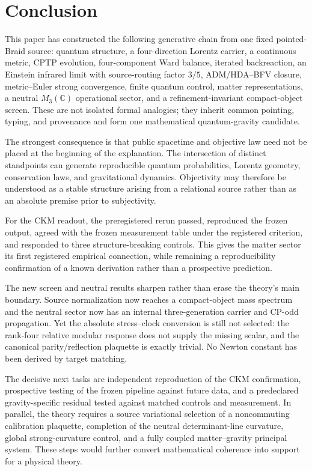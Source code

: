\documentclass[11pt]{article}
\theoremstyle{definition}
\theoremstyle{remark}
\begin{document}
\section{Conclusion}

This paper has constructed the following generative chain from one fixed pointed-Braid source: quantum structure, a four-direction Lorentz carrier, a continuous metric, CPTP evolution, four-component Ward balance, iterated backreaction, an Einstein infrared limit with source-routing factor $3/5$, ADM/HDA--BFV closure, metric--Euler strong convergence, finite quantum control, matter representations, a neutral $M_3(\mathbb C)$ operational sector, and a refinement-invariant compact-object screen. These are not isolated formal analogies; they inherit common pointing, typing, and provenance and form one mathematical quantum-gravity candidate.

The strongest consequence is that public spacetime and objective law need not be placed at the beginning of the explanation. The intersection of distinct standpoints can generate reproducible quantum probabilities, Lorentz geometry, conservation laws, and gravitational dynamics. Objectivity may therefore be understood as a stable structure arising from a relational source rather than as an absolute premise prior to subjectivity.

For the CKM readout, the preregistered rerun passed, reproduced the frozen output, agreed with the frozen measurement table under the registered criterion, and responded to three structure-breaking controls. This gives the matter sector its first registered empirical connection, while remaining a reproducibility confirmation of a known derivation rather than a prospective prediction.

The new screen and neutral results sharpen rather than erase the theory's main boundary. Source normalization now reaches a compact-object mass spectrum and the neutral sector now has an internal three-generation carrier and CP-odd propagation. Yet the absolute stress--clock conversion is still not selected: the rank-four relative modular response does not supply the missing scalar, and the canonical parity/reflection plaquette is exactly trivial. No Newton constant has been derived by target matching.

The decisive next tasks are independent reproduction of the CKM confirmation, prospective testing of the frozen pipeline against future data, and a predeclared gravity-specific residual tested against matched controls and measurement. In parallel, the theory requires a source variational selection of a noncommuting calibration plaquette, completion of the neutral determinant-line curvature, global strong-curvature control, and a fully coupled matter--gravity principal system. These steps would further convert mathematical coherence into support for a physical theory.
\end{document}
